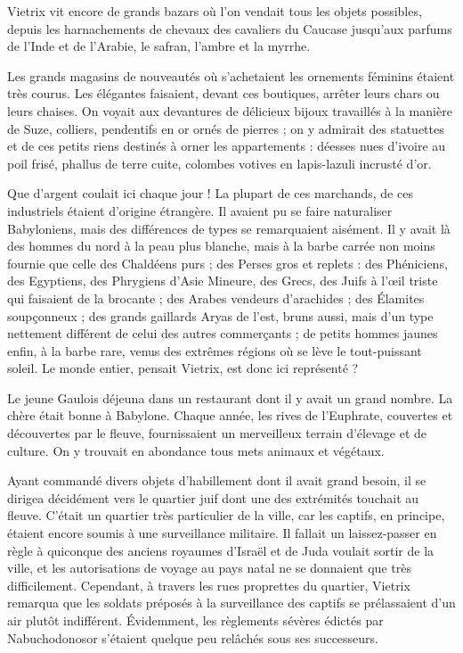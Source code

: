 \documentclass[a4paper, 11pt, oneside, polutonikogreek, french]{article}
\begin{document}
Vietrix vit encore de grands bazars où l'on vendait tous les objets possibles, depuis les harnachements de chevaux des cavaliers du Caucase jusqu'aux parfums de l'Inde et de l'Arabie, le safran, l'ambre et la myrrhe.

Les grands magasins de nouveautés où s'achetaient les ornements féminins étaient très courus. Les élégantes faisaient, devant ces boutiques, arrêter leurs chars ou leurs chaises. On voyait aux devantures de délicieux bijoux travaillés à la manière de Suze, colliers, pendentifs en or ornés de pierres ; on y admirait des statuettes et de ces petits riens destinés à orner les appartements : déesses nues d'ivoire au poil frisé, phallus de terre cuite, colombes votives en lapis-lazuli incrusté d'or.

\bigskip
\centerline{\EightStarTaper}
\centerline{\EightStarTaper\EightStarTaper}
\bigskip

Que d'argent coulait ici chaque jour ! La plupart de ces marchands, de ces industriels étaient d'origine étrangère. Il avaient pu se faire naturaliser Babyloniens, mais des différences de types se remarquaient aisément. Il y avait là des hommes du nord à la peau plus blanche, mais à la barbe carrée non moins fournie que celle des Chaldéens purs ; des Perses gros et replets : des Phéniciens, des Egyptiens, des Phrygiens d'Asie Mineure, des Grecs, des Juifs à l'œil triste qui faisaient de la brocante ; des Arabes vendeurs d'arachides ; des Élamites soupçonneux ; des grands gaillards Aryas de l'est, bruns aussi, mais d'un type nettement différent de celui des autres commerçants ; de petits hommes jaunes enfin, à la barbe rare, venus des extrêmes régions où se lève le tout-puissant soleil. Le monde entier, pensait Vietrix, est donc ici représenté ?

\bigskip
\centerline{\EightStarTaper}
\centerline{\EightStarTaper\EightStarTaper}
\bigskip

Le jeune Gaulois déjeuna dans un restaurant dont il y avait un grand nombre. La chère était bonne à Babylone. Chaque année, les rives de l'Euphrate, couvertes et découvertes par le fleuve, fournissaient un merveilleux terrain d'élevage et de culture. On y trouvait en abondance tous mets animaux et végétaux.

\bigskip
\centerline{\EightStarTaper}
\centerline{\EightStarTaper\EightStarTaper}
\bigskip

Ayant commandé divers objets d'habillement dont il avait grand besoin, il se dirigea décidément vers le quartier juif dont une des extrémités touchait au fleuve. C'était un quartier très particulier de la ville, car les captifs, en principe, étaient encore soumis à une surveillance militaire. Il fallait un laissez-passer en règle à quiconque des anciens royaumes d'Israël et de Juda voulait sortir de la ville, et les autorisations de voyage au pays natal ne se donnaient que très difficilement. Cependant, à travers les rues proprettes du quartier, Vietrix remarqua que les soldats préposés à la surveillance des captifs se prélassaient d'un air plutôt indifférent. Évidemment, les règlements sévères édictés par Nabuchodonosor s'étaient quelque peu relâchés sous ses successeurs.
\end{document}
